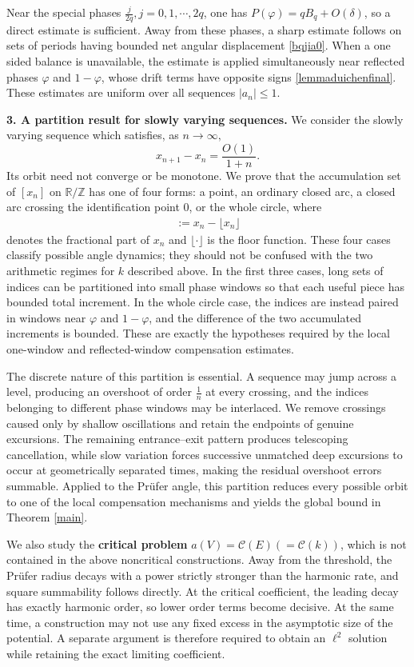 \documentclass[12pt]{amsart}
\theoremstyle{plain}
\theoremstyle{definition}
\begin{document}
Near the special phases $\frac{j}{2q},j=0,1,\cdots,2q$, one has
$P(\varphi)=qB_q+O(\delta)$, so a direct estimate is sufficient. Away
from these phases, a sharp estimate follows on
sets of periods having bounded net angular displacement \eqref{bqjia0}. When a one sided balance is unavailable, the estimate
is applied simultaneously near reflected phases $\varphi$ and
$1-\varphi$, whose drift terms have opposite signs  \eqref{lemmaduichenfinal}. These estimates
are uniform over all sequences $|a_n|\leq1$.

\medskip
\noindent\textbf{3. A partition result for slowly varying sequences.}
We consider the slowly varying sequence which satisfies, as $n\to\infty,$
\[
x_{n+1}-x_n=\frac{O(1)}{1+n}.
\]
Its orbit need not converge or be monotone. We prove that the
accumulation set of $[x_n]$ on $\mathbb R/\mathbb Z$ has one of four
forms: a point, an ordinary closed arc, a closed arc crossing the
identification point $0$, or the whole circle, where 
\begin{align}
	[x_n]:=x_n-\lfloor x_n\rfloor
\end{align}
denotes the fractional part of $x_n$ and $\lfloor \cdot\rfloor$ is the floor function.
These four cases
classify possible angle dynamics; they should not be confused with
the two arithmetic regimes for $k$ described above.
In the first three cases, long sets of indices can be partitioned into
small phase windows so that each useful piece has bounded total
increment. In the whole circle
case, the indices are instead paired in windows near $\varphi$ and
$1-\varphi$, and the difference of the two accumulated increments is
bounded. These are exactly the hypotheses required by the local
one-window and reflected-window compensation estimates.

The discrete nature of this partition is essential. A sequence may
jump across a level, producing an overshoot of order $\frac{1}{n}$ at every
crossing, and the indices belonging to different phase windows may be
interlaced. We remove crossings caused only by shallow oscillations
and retain the endpoints of genuine excursions. The remaining
entrance--exit pattern produces telescoping cancellation, while slow
variation forces successive unmatched deep excursions to occur at
geometrically separated times, making the residual overshoot errors
summable. Applied to the Pr\"ufer angle, this partition reduces every
possible orbit to one of the local compensation mechanisms and yields
the global bound in Theorem \ref{main}.

We also study the \textbf{critical problem }$a(V)=\mathcal C(E)(=\mathcal{C} (k))$, which is not contained in the above
 noncritical
constructions. Away from the
threshold, the Pr\"ufer radius decays with a power strictly stronger
than the harmonic rate, and square summability follows directly. At
the critical coefficient, the leading decay has exactly harmonic
order, so lower order terms become decisive. At the same time, a
construction may not use any fixed excess in the asymptotic size of
the potential. A separate argument is therefore required to obtain an
$\ell^2$ solution while retaining the exact limiting coefficient.
\end{document}
